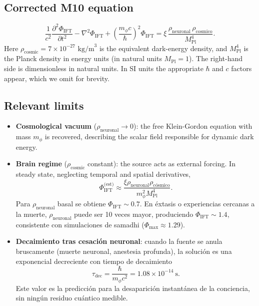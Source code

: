 \documentclass[12pt, a4paper]{article}
\theoremstyle{miuThm}
\theoremstyle{remark}
\newcommand{\MPl}{M_{\text{Pl}}}
\begin{document}
\subsection{Corrected M10 equation}
\begin{equation}
\boxed{
\frac{1}{c^2}\frac{\partial^2 \Phi_{\text{IFT}}}{\partial t^2} - \nabla^2 \Phi_{\text{IFT}} + \left(\frac{m_\phi c}{\hbar}\right)^2 \Phi_{\text{IFT}} = \xi \, \frac{\rho_{\text{neuronal}} \, \rho_{\text{cosmico}}}{\MPl^4}
}.
\end{equation}
Here $\rho_{\text{cosmic}} = 7\times10^{-27}\text{ kg/m}^3$ is the equivalent dark-energy density, and $M_{\text{Pl}}^4$ is the Planck density in energy units (in natural units $M_{\text{Pl}}=1$). The right-hand side is dimensionless in natural units. In SI units the appropriate $\hbar$ and $c$ factors appear, which we omit for brevity.

\subsection{Relevant limits}
\begin{itemize}
\item \textbf{Cosmological vacuum} ($\rho_{\text{neuronal}}\to0$): the free Klein-Gordon equation with mass $m_\phi$ is recovered, describing the scalar field responsible for dynamic dark energy.
\item \textbf{Brain regime} ($\rho_{\text{cosmic}}$ constant): the source acts as external forcing. In steady state, neglecting temporal and spatial derivatives,
\begin{equation}
\Phi_{\text{IFT}}^{\text{(est)}} \approx \frac{\xi \rho_{\text{neuronal}} \rho_{\text{cósmico}}}{m_\phi^2 M_{\text{Pl}}^4}.
\end{equation}
Para $\rho_{\text{neuronal}}$ basal se obtiene $\Phi_{\text{IFT}} \sim 0.7$. En éxtasis o experiencias cercanas a la muerte, $\rho_{\text{neuronal}}$ puede ser 10 veces mayor, produciendo $\Phi_{\text{IFT}} \sim 1.4$, consistente con simulaciones de samadhi ($\Phi_{\max}\approx1.29$).
\item \textbf{Decaimiento tras cesación neuronal}: cuando la fuente se anula bruscamente (muerte neuronal, anestesia profunda), la solución es una exponencial decreciente con tiempo de decaimiento
\begin{equation}
\tau_{\text{dec}} = \frac{\hbar}{m_\phi c^2} = 1.08\times10^{-14}\ \text{s}.
\end{equation}
Este valor es la predicción para la desaparición instantánea de la conciencia, sin ningún residuo cuántico medible.
\end{itemize}
\end{document}
